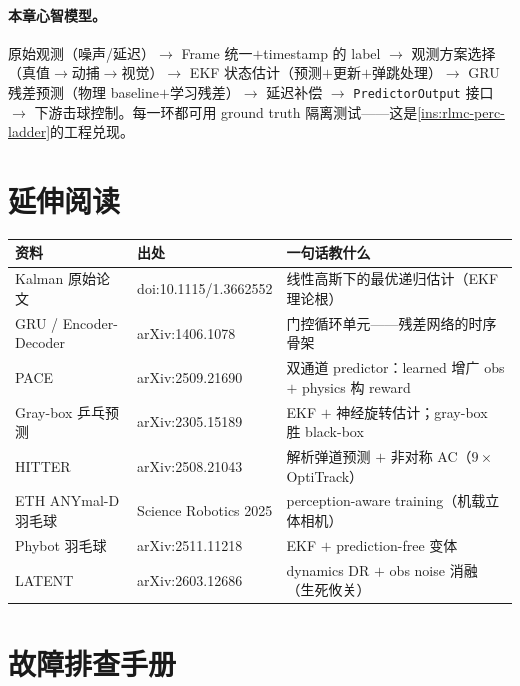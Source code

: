 \paragraph{本章心智模型。}原始观测（噪声/延迟）$\to$ Frame 统一$+$timestamp 的 label $\to$ 观测方案选择（真值$\to$动捕$\to$视觉）$\to$ EKF 状态估计（预测$+$更新$+$弹跳处理）$\to$ GRU 残差预测（物理 baseline$+$学习残差）$\to$ 延迟补偿 $\to$ \verb|PredictorOutput| 接口 $\to$ 下游击球控制。每一环都可用 ground truth 隔离测试——这是\cref{ins:rlmc-perc-ladder}的工程兑现。

\section*{延伸阅读}
\label{sec:rlmc-perc-further}

\begin{center}
\small
\begin{tabular}{@{}lll@{}}
\toprule
资料 & 出处 & 一句话教什么 \\
\midrule
Kalman 原始论文 & doi:10.1115/1.3662552\cite{kalman1960} & 线性高斯下的最优递归估计（EKF 理论根） \\
GRU / Encoder-Decoder & arXiv:1406.1078\cite{cho2014gru} & 门控循环单元——残差网络的时序骨架 \\
PACE & arXiv:2509.21690\cite{tennis_pace2025} & 双通道 predictor：learned 增广 obs $+$ physics 构 reward \\
Gray-box 乒乓预测 & arXiv:2305.15189\cite{achterhold2023graybox} & EKF $+$ 神经旋转估计；gray-box 胜 black-box \\
HITTER & arXiv:2508.21043\cite{tennis_hitter2025} & 解析弹道预测 $+$ 非对称 AC（$9\times$ OptiTrack） \\
ETH ANYmal-D 羽毛球 & Science Robotics 2025\cite{tennis_eth2025badminton} & perception-aware training（机载立体相机） \\
Phybot 羽毛球 & arXiv:2511.11218\cite{tennis_phybot2025} & EKF $+$ prediction-free 变体 \\
LATENT & arXiv:2603.12686\cite{tennis_latent2026} & dynamics DR $+$ obs noise 消融（生死攸关） \\
\bottomrule
\end{tabular}
\end{center}

\section*{故障排查手册}
\label{sec:rlmc-perc-trouble}

